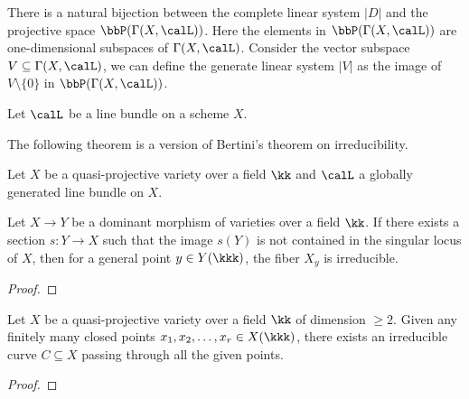     There is a natural bijection between the complete linear system \(|D|\) and the projective space \(\bbP(\Gamma(X,\calL))\).
    Here the elements in \(\bbP(\Gamma(X,\calL))\) are one-dimensional subspaces of \(\Gamma(X,\calL)\).
    Consider the vector subspace \(V\subseteq \Gamma(X,\calL)\), we can define the generate linear system \(|V|\) as the image of \(V\setminus \{0\}\) in \(\bbP(\Gamma(X,\calL))\).


    \begin{definition}\label{def:base_locus_and_base_idea}
        Let \(\calL\) be a line bundle on a scheme \(X\).
    \end{definition}



    The following theorem is a version of Bertini's theorem on irreducibility.

    \begin{theorem}[Bertini]\label{thm:bertini_of_irreduciblility}
        Let \(X\) be a quasi-projective variety over a field \(\kk\) and \(\calL\) a globally generated line bundle on \(X\).
    \end{theorem}

    \begin{lemma}\label{lem:dominant_morphism_admitting_a_section_has_irreducible_fiber}
        Let \(X \to Y\) be a dominant morphism of varieties over a field \(\kk\).
        If there exists a section \(s:Y \to X\) such that the image \(s(Y)\) is not contained in the singular locus of \(X\), 
        then for a general point \(y \in Y(\kkk)\), the fiber \(X_y\) is irreducible.
    \end{lemma}
    \begin{proof}
        \Yang{}
    \end{proof}


    \begin{corollary}\label{thm:curve_through_finite_given_point}
        Let \(X\) be a quasi-projective variety over a field \(\kk\) of dimension \(\geq 2\).
        Given any finitely many closed points \(x_1, x_2, \ldots, x_r\in X(\kkk)\), there exists an irreducible curve \(C \subseteq X\) passing through all the given points.
    \end{corollary}
    \begin{proof}
        \Yang{}
    \end{proof}



